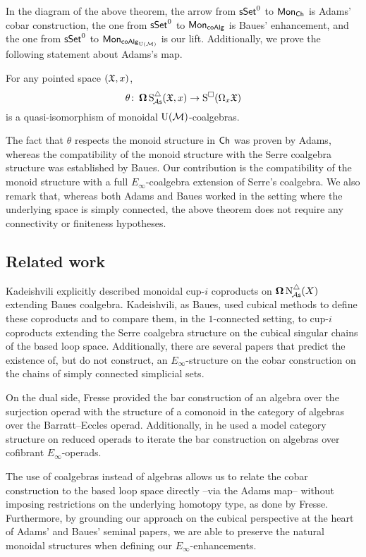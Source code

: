 In the diagram of the above theorem, the arrow from $\mathsf{sSet}^0$ to $\mathsf{Mon}_{\mathsf{Ch}}$ is Adams' cobar construction, the one from $\mathsf{sSet}^0$ to $\mathsf{Mon}_{\mathsf{coAlg}}$ is Baues' enhancement, and the one from $\mathsf{sSet}^0$ to $\mathsf{Mon}_{\mathsf{coAlg}_{{\operatorname{U}(\mathcal{M})}}}$ is our lift.
Additionally, we prove the following statement about Adams's map.


\begin{theorem*}
	For any pointed space $(\mathfrak{X}, x)$,
	\[
	\theta \colon \operatorname{\mathbf{\Omega}} \operatorname{S^{\triangle}_{\!{\mathcal{A}\mathsf{s}}}}(\mathfrak{X}, x) \to \operatorname{S^{\square}}(\Omega_x \mathfrak{X})
	\]
	is a quasi-isomorphism of monoidal ${\operatorname{U}(\mathcal{M})}$-coalgebras.
\end{theorem*}

The fact that $\theta$ respects the monoid structure in $\mathsf{Ch}$ was proven by Adams, whereas the compatibility of the monoid structure with the Serre coalgebra structure was established by Baues.
Our contribution is the compatibility of the monoid structure with a full $E_\infty$-coalgebra extension of Serre's coalgebra.
We also remark that, whereas both Adams and Baues worked in the setting where the underlying space is simply connected, the above theorem does not require any connectivity or finiteness hypotheses.

\subsection*{Related work}

Kadeishvili \cite{kadeishvili1999coproducts, kadeishvili2003cupi} explicitly described monoidal cup-$i$ coproducts on $\operatorname{\mathbf{\Omega}} \operatorname{N^{\triangle}_{\!{\mathcal{A}\mathsf{s}}}}(X)$ extending Baues coalgebra.
Kadeishvili, as Baues, used cubical methods to define these coproducts and to compare them, in the $1$-connected setting, to cup-$i$ coproducts extending the Serre coalgebra structure on the cubical singular chains of the based loop space.
Additionally, there are several papers \cite{smirnov1990iterated, smith1994cobar, smith2000operads, kadeishvili1998iterating} that predict the existence of, but do not construct, an $E_\infty$-structure on the cobar construction on the chains of simply connected simplicial sets.

On the dual side, Fresse \cite{fresse2003hopf} provided the bar construction of an algebra over the surjection operad with the structure of a comonoid in the category of algebras over the Barratt--Eccles operad.
Additionally, in \cite{fresse2010bar} he used a model category structure on reduced operads \cite{berger2003modelcategory, hinich1997homologicalalgebra} to iterate the bar construction on algebras over cofibrant $E_\infty$-operads.

The use of coalgebras instead of algebras allows us to relate the cobar construction to the based loop space directly --via the Adams map-- without imposing restrictions on the underlying homotopy type, as done by Fresse.
Furthermore, by grounding our approach on the cubical perspective at the heart of Adams' and Baues' seminal papers, we are able to preserve the natural monoidal structures when defining our $E_\infty$-enhancements.
